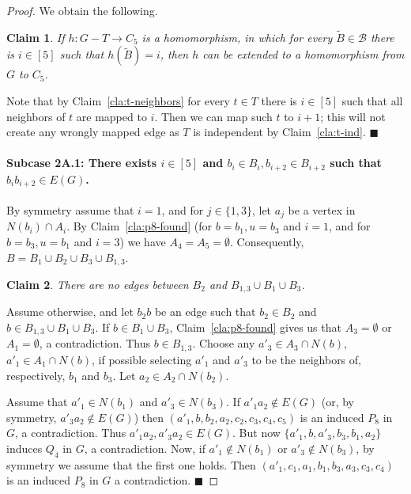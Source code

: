 \documentclass[11pt,a4paper]{article}
\theoremstyle{mystyle}
\newtheorem{claim}{Claim}[theorem]
\newenvironment{claimproof}{\noindent {\emph{Proof of Claim.}}}{\hfill$\blacksquare$\medskip}
\newcommand{\cB}{\mathcal{B}}
\begin{document}
\begin{proof}
We obtain the following.
\begin{claim}\label{cla:t-homo}
If $h:G - T \to C_5$ is a homomorphism, in which for every $\widetilde{B} \in \cB$ there is $i \in [5]$
such that $h(\widetilde{B}) = i$,
then $h$ can be extended to a homomorphism  from $G$ to $C_5$.
\end{claim}
\begin{claimproof}
Note that by Claim~\ref{cla:t-neighbors} for every $t \in T$ there is $i \in [5]$ such that all neighbors of $t$ are mapped to $i$. Then we can map such $t$ to $i+1$; this will not create any wrongly mapped edge as $T$ is independent by Claim~\ref{cla:t-ind}.
\end{claimproof}


\paragraph{Subcase 2A.1: There exists $i \in [5]$ and $b_i \in B_i, b_{i+2} \in B_{i+2}$ such that $b_ib_{i+2} \in E(G)$.}
By symmetry assume that $i=1$, and for $j \in \{1,3\}$, let $a_j$ be a vertex in $N(b_i) \cap A_i$.
By Claim~\ref{cla:p8-found} (for $b=b_1,u=b_3$ and $i=1$, and for $b=b_3,u=b_1$ and $i=3$) we have $A_4=A_5=\emptyset$. Consequently, $B = B_1 \cup B_2 \cup B_3 \cup B_{1,3}$.

\begin{claim}
    There are no edges between $B_2$ and $B_{1,3} \cup B_1 \cup B_3$.
\end{claim}
\begin{claimproof}
Assume otherwise, and let $b_2b$ be an edge such that $b_2 \in B_2$ and $b \in B_{1,3} \cup B_1 \cup B_3$.
If $b \in B_{1} \cup B_3$, Claim~\ref{cla:p8-found} gives us that $A_3=\emptyset$ or $A_1=\emptyset$, a contradiction.
Thus $b \in B_{1,3}$.
Choose any $a'_3 \in A_3 \cap N(b)$, $a'_1 \in A_1 \cap N(b)$, if possible selecting $a'_1$ and $a'_3$ to be the neighbors of, respectively, $b_1$ and $b_3$. Let $a_2 \in A_2 \cap N(b_2)$.

Assume that $a'_1 \in N(b_1)$ and $a'_3 \in N(b_3)$. If $a'_1a_2 \notin E(G)$ (or, by symmetry, $a'_3a_2 \notin E(G)$) then $(a'_1,b,b_2,a_2,c_2,c_3,c_4,c_5)$ is an induced $P_8$ in $G$, a contradiction. Thus $a'_1a_2,a'_3a_2 \in E(G)$. But now $\{a'_1,b,a'_3,b_3,b_1,a_2\}$ induces $Q_4$ in $G$, a contradiction. Now, if $a'_1 \notin N(b_1)$ or $a'_3 \notin N(b_{3})$, by symmetry we assume that the first one holds. Then $(a'_1,c_1,a_1,b_1,b_3,a_3,c_3,c_4)$ is an induced $P_8$ in $G$ a contradiction.
\end{claimproof}



\end{proof}
\end{document}

